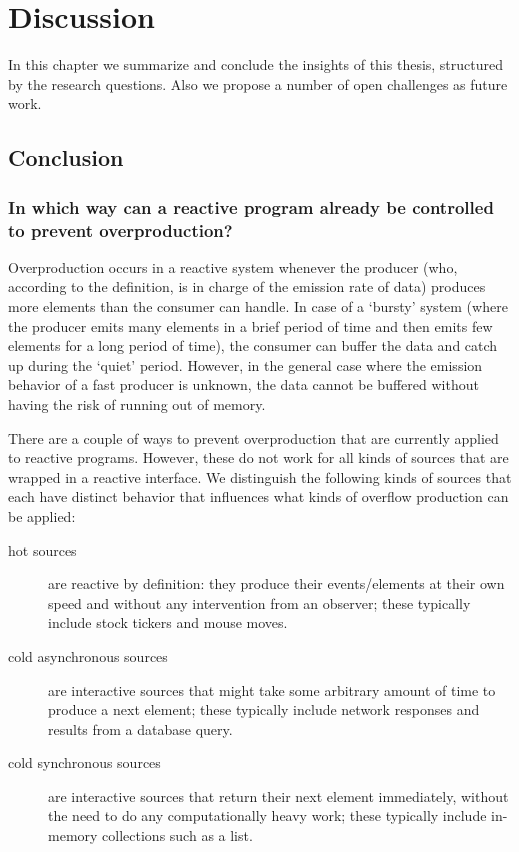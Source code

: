 \chapter{Discussion}
In this chapter we summarize and conclude the insights of this thesis, structured by the research questions. Also we propose a number of open challenges as future work.

\section{Conclusion}
\subsection*{In which way can a reactive program already be controlled to prevent overproduction?}
Overproduction occurs in a reactive system whenever the producer (who, according to the definition, is in charge of the emission rate of data) produces more elements than the consumer can handle. In case of a `bursty' system (where the producer emits many elements in a brief period of time and then emits few elements for a long period of time), the consumer can buffer the data and catch up during the `quiet' period. However, in the general case where the emission behavior of a fast producer is unknown, the data cannot be buffered without having the risk of running out of memory.

There are a couple of ways to prevent overproduction that are currently applied to reactive programs. However, these do not work for all kinds of sources that are wrapped in a reactive interface. We distinguish the following kinds of sources that each have distinct behavior that influences what kinds of overflow production can be applied:

\begin{description}
	\item [hot sources] are reactive by definition: they produce their events/elements at their own speed and without any intervention from an observer; these typically include stock tickers and mouse moves.
	\item [cold asynchronous sources] are interactive sources that might take some arbitrary amount of time to produce a next element; these typically include network responses and results from a database query.
	\item [cold synchronous sources] are interactive sources that return their next element immediately, without the need to do any computationally heavy work; these typically include in-memory collections such as a list.
\end{description}

